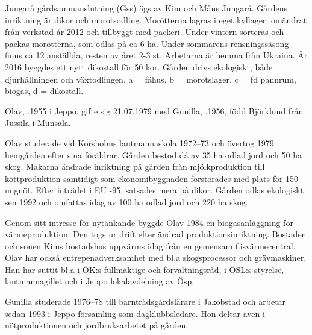 

Jungarå gårdsammanslutning (Gss) ägs av Kim och Måns Jungarå. Gårdens inriktning är dikor och morotsodling. Morötterna lagras i eget kyllager, omändrat från verkstad år 2012 och tillbyggt med packeri. Under vintern sorteras och packas morötterna, som odlas på ca 6 ha. Under sommarens rensningssäsong finns ca 12 anställda, resten av året 2-3 st. Arbetarna är hemma från Ukraina. År 2016 byggdes ett nytt dikostall för 50 kor. Gården drivs ekologiskt, både djurhållningen och växtodlingen. a = fähus, b = morotslager, c = fd pannrum, biogas,  d = dikostall.



Olav, .1955 i Jeppo, gifte sig 21.07.1979 med Gunilla, .1956, född Björklund från Jussila i Munsala.
\begin{jhchildren}
  \item {}
  \item {}
  \item {}
\end{jhchildren}
Olav studerade vid Korsholms lantmannaskola 1972--73 och övertog 1979 hemgården efter sina föräldrar. Gården bestod då av 35 ha odlad jord och 50 ha skog. Makarna ändrade inriktning på gården från mjölkproduktion till köttproduktion samtidigt som ekonomibyggnaden förstorades med plats för 150 ungnöt. Efter inträdet i EU -95, satsades mera på dikor. Gården odlas ekologiskt sen 1992 och omfattas idag av 100 ha odlad jord och 220 ha skog.

Genom sitt intresse för nytänkande byggde Olav 1984 en biogasanläggning för värmeproduktion. Den togs ur drift efter ändrad produktionsinriktning. Bostaden och sonen Kims bostadshus uppvärms idag från en gemensam flisvärmecentral. Olav har också entrepenadverksamhet med bl.a skogsprocessor och grävmaskiner. Han har suttit bl.a i ÖK:s fullmäktige och förvaltningsråd, i ÖSL:s styrelse, lantmannagillet och i Jeppo lokalavdelning av Ösp.

Gunilla studerade 1976--78 till barnträdsgårdslärare i Jakobstad och arbetar sedan 1993 i Jeppo församling som dagklubbsledare. Hon deltar även i nötproduktionen och jordbruksarbetet på gården.


